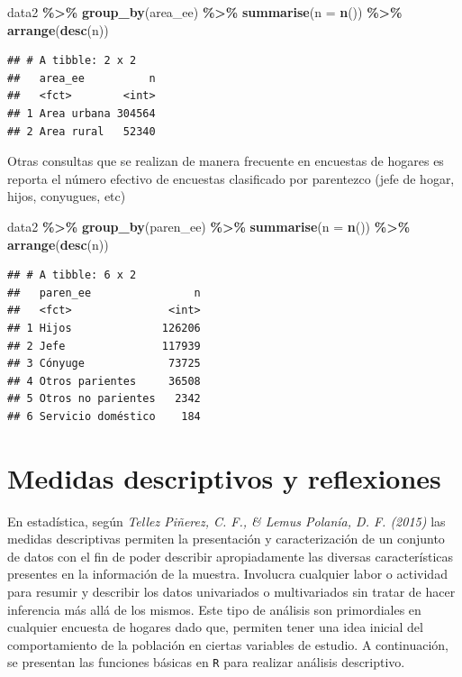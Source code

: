 \documentclass[
  12pt,
]{book}
\newenvironment{Shaded}{\begin{snugshade}}{\end{snugshade}}
\newcommand{\AttributeTok}[1]{\textcolor[rgb]{0.13,0.29,0.53}{#1}}
\newcommand{\FunctionTok}[1]{\textcolor[rgb]{0.13,0.29,0.53}{\textbf{#1}}}
\newcommand{\NormalTok}[1]{#1}
\newcommand{\SpecialCharTok}[1]{\textcolor[rgb]{0.81,0.36,0.00}{\textbf{#1}}}
\begin{document}
\begin{Shaded}
\begin{Highlighting}[]
\NormalTok{data2 }\SpecialCharTok{\%\textgreater{}\%} 
  \FunctionTok{group\_by}\NormalTok{(area\_ee) }\SpecialCharTok{\%\textgreater{}\%} 
  \FunctionTok{summarise}\NormalTok{(}\AttributeTok{n =} \FunctionTok{n}\NormalTok{()) }\SpecialCharTok{\%\textgreater{}\%} \FunctionTok{arrange}\NormalTok{(}\FunctionTok{desc}\NormalTok{(n))}
\end{Highlighting}
\end{Shaded}

\begin{verbatim}
## # A tibble: 2 x 2
##   area_ee          n
##   <fct>        <int>
## 1 Area urbana 304564
## 2 Area rural   52340
\end{verbatim}

Otras consultas que se realizan de manera frecuente en encuestas de hogares es reporta el número efectivo de encuestas clasificado por parentezco (jefe de hogar, hijos, conyugues, etc)

\begin{Shaded}
\begin{Highlighting}[]
\NormalTok{data2 }\SpecialCharTok{\%\textgreater{}\%} 
  \FunctionTok{group\_by}\NormalTok{(paren\_ee) }\SpecialCharTok{\%\textgreater{}\%} 
  \FunctionTok{summarise}\NormalTok{(}\AttributeTok{n =} \FunctionTok{n}\NormalTok{()) }\SpecialCharTok{\%\textgreater{}\%} \FunctionTok{arrange}\NormalTok{(}\FunctionTok{desc}\NormalTok{(n)) }
\end{Highlighting}
\end{Shaded}

\begin{verbatim}
## # A tibble: 6 x 2
##   paren_ee                n
##   <fct>               <int>
## 1 Hijos              126206
## 2 Jefe               117939
## 3 Cónyuge             73725
## 4 Otros parientes     36508
## 5 Otros no parientes   2342
## 6 Servicio doméstico    184
\end{verbatim}

\section{Medidas descriptivos y reflexiones}\label{medidas-descriptivos-y-reflexiones}

En estadística, según \emph{Tellez Piñerez, C. F., \& Lemus Polanía, D. F. (2015)} las medidas descriptivas permiten la presentación y caracterización de un conjunto de datos con el fin de poder describir apropiadamente las diversas características presentes en la información de la muestra. Involucra cualquier labor o actividad para resumir y describir los datos univariados o multivariados sin tratar de hacer inferencia más allá de los mismos. Este tipo de análisis son primordiales en cualquier encuesta de hogares dado que, permiten tener una idea inicial del comportamiento de la población en ciertas variables de estudio. A continuación, se presentan las funciones básicas en \texttt{R} para realizar análisis descriptivo.
\end{document}
